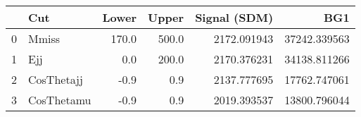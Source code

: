 \begin{tabular}{llrrrr}
\toprule
{} &         Cut &  Lower &  Upper &  Signal (SDM) &          BG1  \\
\midrule
0 &       Mmiss &  170.0 &  500.0 &   2172.091943 &  37242.339563 \\
1 &         Ejj &    0.0 &  200.0 &   2170.376231 &  34138.811266 \\
2 &  CosThetajj &   -0.9 &    0.9 &   2137.777695 &  17762.747061 \\
3 &  CosThetamu &   -0.9 &    0.9 &   2019.393537 &  13800.796044 \\
\bottomrule
\end{tabular}
